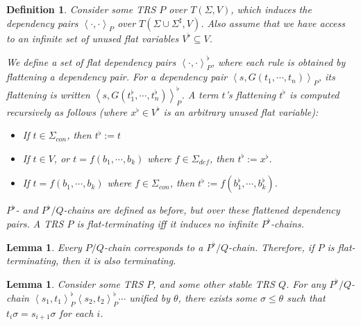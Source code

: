 \documentclass{article}
\newtheorem{lemma}[theorem]{Lemma}
\newtheorem{definition}[theorem]{Definition}
\newcommand{\dpair}[2]{\left\langle #1, #2 \right\rangle}
\begin{document}
\begin{definition}
    Consider some TRS $P$ over $T(\Sigma, V)$, which induces the dependency pairs $\dpair{\cdot}{\cdot}_P$ over $T(\Sigma \cup \Sigma^\sharp, V)$. Also assume that we have access to an infinite set of unused \emph{flat variables} $V^\flat \subseteq V$.
    
    We define a set of \emph{flat dependency pairs} $\dpair{\cdot}{\cdot}^\flat_P$, where each rule is obtained by \emph{flattening} a dependency pair. For a dependency pair $\dpair{s}{G(t_1 , \cdots, t_n)}_P$, its flattening is written $\dpair{s}{G( t^\flat_1, \cdots, t_n^\flat)}^\flat_P$. A term $t$'s flattening $t^\flat$ is computed recursively as follows (where $x^\flat \in V^\flat$ is an arbitrary unused flat variable):
    \begin{itemize}
        \item If $t \in \Sigma_{con}$, then $t^\flat := t$
        \item If $t \in V$, or $t = f (b_1, \cdots, b_k)$ where $f \in \Sigma_{def}$, then $t^\flat := x^\flat$.
        \item If $t = f( b_1, \cdots, b_k)$ where $f \in \Sigma_{con}$, then $t^\flat := f( b^\flat_1, \cdots, b^\flat_k)$.
    \end{itemize} 
    $P^\flat$- and $P^\flat/Q$-chains are defined as before, but over these flattened dependency pairs. A TRS $P$ is \emph{flat-terminating} iff it induces no infinite $P^\flat$-chains. 
\end{definition}

\begin{lemma} \label{thm:flat_termination_overapprox}
    Every $P/Q$-chain corresponds to a $P^\flat/Q$-chain. Therefore, if $P$ is flat-terminating, then it is also terminating.
\end{lemma}


\begin{lemma} 
    Consider some TRS $P$, and some other stable TRS $Q$. For any $P^\flat/Q$-chain $\dpair{s_1}{t_1}^\flat_P \dpair{s_2}{t_2}^\flat_P \cdots$ unified by $\theta$, there exists some $\sigma \leq \theta$ such that $t_i \sigma = s_{i+1} \sigma$ for each $i$. 
\end{lemma}
\end{document}
